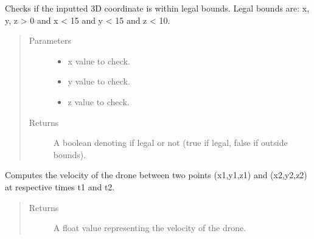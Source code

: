\documentclass[letterpaper,10pt,english]{sphinxmanual}
\begin{document}

\begin{fulllineitems}
\label{\detokenize{index:src.Views.Graph.checkLegalInput}}
Checks if the inputted 3D coordinate is within legal bounds. Legal bounds are:
x, y, z \textgreater{} 0 and x \textless{} 15 and y \textless{} 15 and z \textless{} 10.
\begin{quote}\begin{description}
\item[{Parameters}] \leavevmode\begin{itemize}
\item {} 
 \textendash{} x value to check.

\item {} 
 \textendash{} y value to check.

\item {} 
 \textendash{} z value to check.

\end{itemize}

\item[{Returns}] \leavevmode
A boolean denoting if legal or not (true if legal, false if outside bounds).

\end{description}\end{quote}

\end{fulllineitems}


\begin{fulllineitems}
\label{\detokenize{index:src.Views.Graph.computeVelocity}}
Computes the velocity of the drone between two points (x1,y1,z1) and (x2,y2,z2) at respective times t1 and t2.
\begin{quote}\begin{description}
\item[{Returns}] \leavevmode
A float value representing the velocity of the drone.

\end{description}\end{quote}

\end{fulllineitems}
\end{document}
